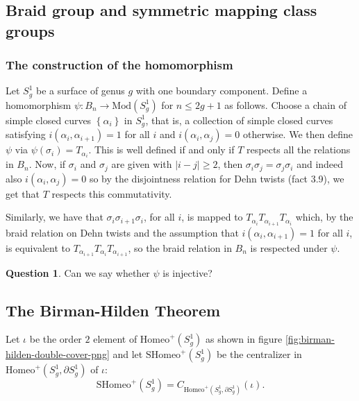 \documentclass[reqno]{amsart}
\theoremstyle{definition}
\newtheorem{question}[theorem]{Question}
\theoremstyle{remark}
\newcommand{\Mod}{{\mathrm{Mod}}}
\newcommand{\Homeo}{{\mathrm{Homeo}}}
\newcommand{\SHomeo}{{\mathrm{SHomeo}}}
\begin{document}
 \newpage

 \subsection{Braid group and symmetric mapping class groups}

 \subsubsection{The construction of the
 homomorphism}\label{birman-hilden-embedding-construction}

 Let $S_{g}^{1}$ be a surface of genus $g$ with
 one boundary component. Define a
 homomorphism $\psi \colon B_n \to 
 \Mod \left( S_g^{1} \right) $ for
 $n \le 2g+1$ as follows.
 Choose a chain of simple closed curves
 $\left\{ \alpha_i \right\} $ in
 $S_{g}^{1}$, that is, a collection of
 simple closed curves satisfying
 $i \left( \alpha_i, \alpha_{i+1} \right) =1$ for
 all $i$ and $i \left( \alpha_i, \alpha_j \right) =0$ otherwise.
 We then define $\psi $ via
 $\psi \left( \sigma_i \right) =
 T_{\alpha_i}$.
 This is well defined if and only if
 $T$ respects all the relations in
 $B_n$. Now, if $\sigma_i$ and
 $\sigma_j$ are given with 
 $\left| i-j \right| \ge 2$, then
 $\sigma_i \sigma_j = \sigma_j \sigma_i$ and
 indeed also
 $i \left( \alpha_i, \alpha_j \right) =0$ so
 by the disjointness relation for
 Dehn twists (fact 3.9), we get
 that $T$ respects this commutativity.

 Similarly, we have that
 $\sigma_i \sigma_{i+1} \sigma_i$, for all $i$,
 is mapped to 
 $T_{\alpha_i} T_{\alpha_{i+1}} T_{\alpha_i}$ which, by the
 braid relation on Dehn twists and the
 assumption that
 $i\left( \alpha_i, \alpha_{i+1} \right) =1$ for all $i$,
 is equivalent to
 $T_{\alpha_{i+1}} T_{\alpha_i}T_{\alpha_{i+1}}$, so
 the braid relation in $B_n$ is respected
 under $\psi $.

 \begin{question}
     Can we say whether $\psi $ is injective?
 \end{question}

 \subsection{The Birman-Hilden Theorem}
Let $\iota$ be the order  $2$ element of
$\Homeo^{+} \left( S_g^{1} \right) $ as
shown in figure \ref{fig:birman-hilden-double-cover-png}
and let $\SHomeo^{+} \left( S_g^{1} \right) $ be
the centralizer in
$\Homeo^{+}\left( S_g^{1}, \partial S_g^{1} \right) $ of
$\iota$:
\[
\SHomeo^{+} \left( S_g^{1} \right) 
= C_{\Homeo^{+} \left( S_g^{1}, \partial
S_g^{1} \right) }\left( \iota \right) .
\] 
\end{document}
